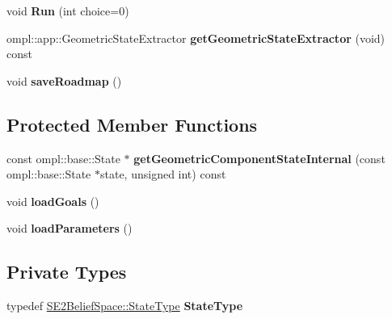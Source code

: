 \begin{DoxyCompactItemize}
\item 
\hypertarget{class_f_i_r_m2_d_setup_ac8e1fdfad92412d6914656e8dc14c16a}{void {\bfseries Run} (int choice=0)}\label{class_f_i_r_m2_d_setup_ac8e1fdfad92412d6914656e8dc14c16a}

\item 
\hypertarget{class_f_i_r_m2_d_setup_a94861030b33ce9ec3a510f6e17885354}{ompl\-::app\-::\-Geometric\-State\-Extractor {\bfseries get\-Geometric\-State\-Extractor} (void) const }\label{class_f_i_r_m2_d_setup_a94861030b33ce9ec3a510f6e17885354}

\item 
\hypertarget{class_f_i_r_m2_d_setup_ac447291bf8113fad78a22484211b39b5}{void {\bfseries save\-Roadmap} ()}\label{class_f_i_r_m2_d_setup_ac447291bf8113fad78a22484211b39b5}

\end{DoxyCompactItemize}
\subsection*{Protected Member Functions}
\begin{DoxyCompactItemize}
\item 
\hypertarget{class_f_i_r_m2_d_setup_a0a10f3d2274108ccfdb1316ce57237cd}{const ompl\-::base\-::\-State $\ast$ {\bfseries get\-Geometric\-Component\-State\-Internal} (const ompl\-::base\-::\-State $\ast$state, unsigned int) const }\label{class_f_i_r_m2_d_setup_a0a10f3d2274108ccfdb1316ce57237cd}

\item 
\hypertarget{class_f_i_r_m2_d_setup_a046fb183988743c249566892d2910f61}{void {\bfseries load\-Goals} ()}\label{class_f_i_r_m2_d_setup_a046fb183988743c249566892d2910f61}

\item 
\hypertarget{class_f_i_r_m2_d_setup_adf290346ae00ff9a0543e888bd404a73}{void {\bfseries load\-Parameters} ()}\label{class_f_i_r_m2_d_setup_adf290346ae00ff9a0543e888bd404a73}

\end{DoxyCompactItemize}
\subsection*{Private Types}
\begin{DoxyCompactItemize}
\item 
\hypertarget{class_f_i_r_m2_d_setup_aed867c24fae57d74b76733eab1e72383}{typedef \hyperlink{class_s_e2_belief_space_1_1_state_type}{S\-E2\-Belief\-Space\-::\-State\-Type} {\bfseries State\-Type}}\label{class_f_i_r_m2_d_setup_aed867c24fae57d74b76733eab1e72383}

\end{DoxyCompactItemize}
